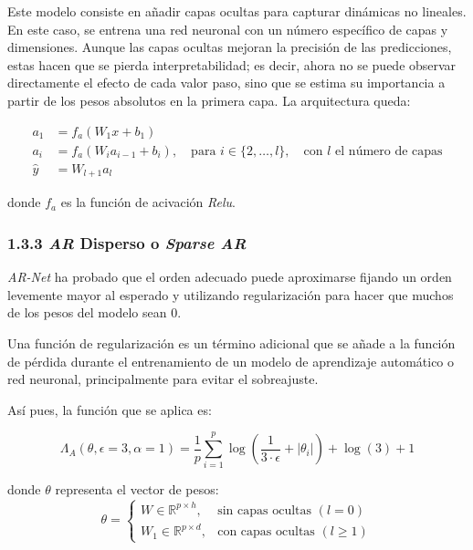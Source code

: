 \documentclass[12pt,twoside]{article}
\begin{document}
Este modelo consiste en añadir capas ocultas para capturar dinámicas no lineales. En este caso, se entrena una red neuronal con un número específico de capas y dimensiones. Aunque las capas ocultas mejoran la precisión de las predicciones, estas hacen que se pierda interpretabilidad; es decir, ahora no se puede observar directamente el efecto de cada valor paso, sino que se estima su importancia a partir de los pesos absolutos en la primera capa. La arquitectura queda:

\begin{equation}
\begin{aligned}
a_1 &= f_a(W_1 x + b_1) \\
a_i &= f_a(W_i a_{i-1} + b_i), \quad \text{para } i \in \{2, \dots, l\} ,  \quad \text{con $l$ el número de capas}\\
\hat{y} &= W_{l+1} a_l
\end{aligned}
\end{equation}

donde $f_a$ es la función de acivación \textit{Relu}.


\subsubsection*{1.3.3 \textit{AR} Disperso o \textit{Sparse AR}}\label{sec:27}

\textit{AR-Net} ha probado que el orden adecuado puede aproximarse fijando un orden levemente mayor al esperado y utilizando regularización para hacer que muchos de los pesos del modelo sean 0. 

Una función de regularización es un término adicional que se añade a la función de pérdida durante el entrenamiento de un modelo de aprendizaje automático o red neuronal, principalmente para evitar el sobreajuste. 

Así pues, la función que se aplica es:

\begin{equation}
\Lambda_A(\theta, \epsilon = 3, \alpha = 1) = \frac{1}{p}\sum_{i=1}^{p} \log\left(\frac{1}{3 \cdot \epsilon} + |\theta_i|\right) + \log(3) + 1
\end{equation}

donde $\theta$ representa el vector de pesos:
\begin{equation}
\theta =
\begin{cases}
W \in \mathbb{R}^{p \times h}, & \text{sin capas ocultas } (l = 0) \\
W_1 \in \mathbb{R}^{p \times d}, & \text{con capas ocultas } (l \geq 1)
\end{cases}
\end{equation}
\end{document}
